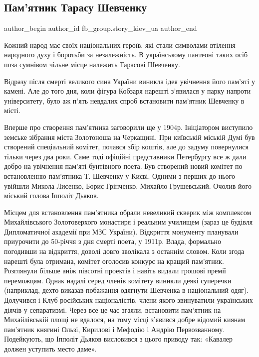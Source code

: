  
 
 
 
 
 
\subsection{Пам'ятник Тарасу Шевченку}
\label{sec:07_12_2020.fb.fb_group.story_kiev_ua.1.taras_shevchenko_pamjatnyk}
\ifcmt
	author_begin
   author_id fb_group.story_kiev_ua
	author_end
\fi
{}

Кожний народ має своїх національних героїв, які стали символами втілення
народного духу і боротьби за незалежність. В українському пантеоні таких осіб
поза сумнівом чільне місце належить Тарасові Шевченку.

Відразу після смерті великого сина України виникла ідея увічнення його пам’яті
у камені. Але до того дня, коли фігура Кобзаря нарешті з’явилася у парку
напроти університету, було аж п’ять невдалих спроб встановити пам’ятник
Шевченку в місті.

Вперше про створення пам’ятника заговорили ще у 1904р. Ініціатором виступило
земське зібрання міста Золотоноша на Черкащині. При київській міській Думі був
створений спеціальний комітет, почався збір коштів, але до задуму повернулися
тільки через два роки. Саме тоді офіційні представники Петербургу все ж дали
добро на увічнення пам’яті бунтівного поета. Був створений новий комітет по
встановленню пам’ятника Т. Шевченку у Києві. Одними з перших до нього увійшли
Микола Лисенко, Борис Грінченко, Михайло Грушевський. Очолив його міський
голова Іпполіт Дьяков.

Місцем для встановлення пам’ятника обрали невеликий скверик між комплексом
Михайлівського Золотоверхого монастиря і реальним училищем (зараз це будівля
Дипломатичної академії при МЗС України). Відкриття монументу планували
приурочити до 50-річчя з дня смерті поета, у 1911р. Влада, формально погодивши
на відкриття, доволі довго зволікала з останнім словом. Коли згода нарешті була
отримана, комітет оголосив конкурс на кращий пам’ятник. Розглянули більше аніж
півсотні проектів і навіть видали грошові премії переможцям. Однак надалі серед
членів комітету виникли деякі суперечки (наприклад, дехто виказав побажання
одягнути Шевченка в національний одяг). Долучився і Клуб російських
націоналістів, члени якого звинуватили українських діячів у сепаратизмі. Через
все це час згаяли, встановити пам’ятник на Михайлівській площі не вдалося, на
тому місці з’явився добре відомий киянам пам’ятник княгині Ользі, Кирилові і
Мефодію і Андрію Первозванному. Подейкують, що Іпполіт Дьяков висловився з
цього приводу так: «Кавалер должен уступить место даме».

